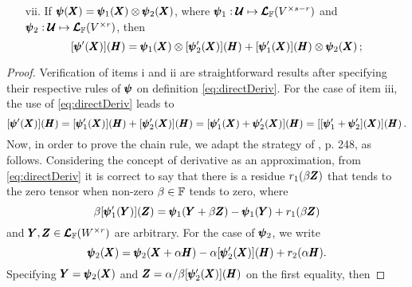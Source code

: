 \begin{itemize}
\begin{equation}
	\end{equation}
	\item[vii.] If $\pmb{\psi}(\pmb{X})=\pmb{\psi}_1(\pmb{X})\otimes\pmb{\psi}_2(\pmb{X})$, where $\pmb{\psi}_1 : \pmb{\mathcal{U}} \mapsto \pmb{\mathcal{L}}_{\mathbb{F}}(V^{\times s-r})$ and $\pmb{\psi}_2 : \pmb{\mathcal{U}} \mapsto \pmb{\mathcal{L}}_{\mathbb{F}}(V^{\times r})$, then
\begin{equation}
[\pmb{\psi}'(\pmb{X})](\pmb{H})=\pmb{\psi}_1(\pmb{X})\otimes[\pmb{\psi}_2'(\pmb{X})](\pmb{H}) + [\pmb{\psi}_1'(\pmb{X})](\pmb{H}) \otimes \pmb{\psi}_2(\pmb{X})\,;
\end{equation}
\end{itemize}

{\footnotesize
\begin{proof}
Verification of items i and ii are straightforward results after specifying their respective rules of $\pmb{\psi}$ on definition \eqref{eq:directDeriv}. For the case of item iii, the use of \eqref{eq:directDeriv} leads to
\begin{equation*}
[\pmb{\psi}'(\pmb{X})](\pmb{H}) = [\pmb{\psi}_1'(\pmb{X})](\pmb{H}) + [\pmb{\psi}'_2(\pmb{X})](\pmb{H}) = [\pmb{\psi}'_1(\pmb{X})+\pmb{\psi}'_2(\pmb{X})](\pmb{H})=[[\pmb{\psi}'_1+\pmb{\psi}'_2](\pmb{X})](\pmb{H})\,.
\end{equation*}
Now, in order to prove the chain rule, we adapt the strategy of \cite{zeidler_1995_1}, p. 248, as follows. Considering the concept of derivative as an approximation, from \eqref{eq:directDeriv} it is correct to say that there is a residue $r_1(\beta\pmb{Z})$ that tends to the zero tensor when non-zero $\beta\in\mathbb{F}$ tends to zero, where
\begin{equation*}
\beta[\pmb{\psi}'_1(\pmb{Y})](\pmb{Z})=\pmb{\psi}_1(\pmb{Y}+\beta\pmb{Z})-\pmb{\psi}_1(\pmb{Y})+r_1(\beta\pmb{Z})
\end{equation*}
and $\pmb{Y},\pmb{Z}\in\pmb{\mathcal{L}}_{\mathbb{F}}(W^{\times r})$ are arbitrary. For the case of $\pmb{\psi}_2$, we write
\begin{equation*}
\pmb{\psi}_2(\pmb{X})=\pmb{\psi}_2(\pmb{X}+\alpha\pmb{H})-\alpha[\pmb{\psi}'_2(\pmb{X})](\pmb{H})+r_2(\alpha\pmb{H}).
\end{equation*}
Specifying $\pmb{Y}=\pmb{\psi}_2(\pmb{X})$ and $\pmb{Z}=\alpha/\beta[\pmb{\psi}'_2(\pmb{X})](\pmb{H})$ on the first equality, then

\end{proof}}
